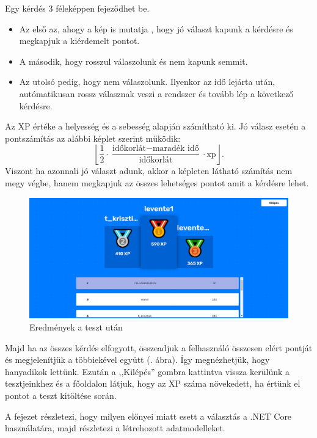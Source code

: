 Egy kérdés 3 féleképpen fejeződhet be.
\begin{itemize}
	\item Az első az, ahogy a kép is mutatja , hogy jó választ kapunk a kérdésre és megkapjuk a kiérdemelt pontot.
	\item A második, hogy rosszul válaszolunk és nem kapunk semmit.
	\item Az utolsó pedig, hogy nem válaszolunk. Ilyenkor az idő lejárta után, autómatikusan rossz válasznak veszi a rendszer és tovább lép a következő kérdésre.
\end{itemize}

Az XP értéke a helyesség és a sebesség alapján számítható ki.
Jó válasz esetén a pontszámítás az alábbi képlet szerint működik:
\[
\left\lfloor
\dfrac{1}{2} \cdot
\frac
{\text{időkorlát} - \text{maradék idő}}
{\text{időkorlát}}
\cdot \text{xp}
\right\rfloor.
\]
Viszont ha azonnali jó választ adunk, akkor a képleten látható számítás nem megy végbe, hanem megkapjuk az összes lehetséges pontot amit a kérdésre lehet.

\begin{figure}[h!]
    \centering
    \includegraphics[width=\linewidth]{images/results.png}
    \caption{Eredmények a teszt után}
    \label{fig:results}
\end{figure}

Majd ha az összes kérdés elfogyott, összeadjuk a felhasználó összesen elért pontját és megjelenítjük a többiekével együtt (. ábra). Így megnézhetjük, hogy hanyadikok lettünk. Ezután a ,,Kilépés'' gombra kattintva vissza kerülünk a tesztjeinkhez és a főoldalon látjuk, hogy az XP száma növekedett, ha értünk el pontot a teszt kitöltése során.


A fejezet részletezi, hogy milyen előnyei miatt esett a választás a .NET Core használatára, majd részletezi a létrehozott adatmodelleket.

